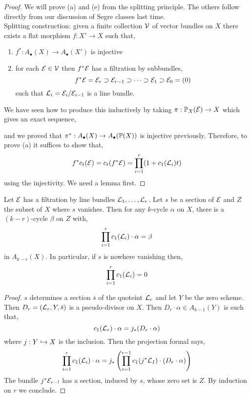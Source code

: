 \documentclass[12pt]{article}
\begin{document}
\begin{proof}
We will prove (a) and (e) from the splitting principle. The others follow directly from our discussion of Segre classes last time. 
\bigskip\\
Splitting construction: given a finite collection $\cV$ of vector bundles on $X$ there exists a flat morphism $f : X' \to X$ such that,
\begin{enumerate}
\item $f^* : A_\bullet(X) \to A_\bullet(X')$ is injective
\item for each $\E \in \cV$ then $f^* \E$ has a filtration by subbundles,
\[ f^* \E = \E_r \supset \E_{r-1} \supset \cdots \supset \E_1 \supset \E_0 = (0) \]
such that $\L_i = \E_i / \E_{i-1}$ is a line bundle. 
\end{enumerate}
We have seen how to produce this inductively by taking $\pi : \P_X(\E) \to X$ which gives an exact sequence,
and we proved that $\pi^* : A_\bullet(X) \to A_\bullet(\P(X))$ is injective previously. Therefore, to prove (a) it suffices to show that,
\[ f^* c_t(\E) = c_t(f^* \E) = \prod_{i = 1}^r (1 + c_1(\L_i) t) \]
using the injectivity. We need a lemma first.
\end{proof}

\begin{prop}
Let $\E$ has a filtration by line bundles $\L_1, \dots , \L_r$. Let $s$ be a section of $\E$ and $Z$ the subset of $X$ where $s$ vanishes. Then for any $k$-cycle $\alpha$ on $X$, there is a $(k-r)$-cycle $\beta$ on $Z$ with,
\[ \prod_{i = 1}^r c_1(\L_i) \cdot \alpha = \beta \]
in $A_{k-r}(X)$. In particular, if $s$ is nowhere vanishing then,
\[ \prod_{i = 1}^r c_1(\L_i) = 0 \]
\end{prop}

\begin{proof}
$s$ determines a section $\bar{s}$ of the quoteint $\L_r$ and let $Y$ be the zero scheme. Then $D_r = (\L_r, Y, \bar{s})$ is a pseudo-divisor on $X$. Then $D_r \cdot \alpha \in A_{k-1}(Y)$ is such that,
\[ c_1(\L_r) \cdot \alpha = j_*(D_r \cdot \alpha) \]
where $j : Y \embed X$ is the inclusion. Then the projection formal says,
\[ \prod_{i = 1}^r c_1(\L_i) \cdot \alpha = j_* \left( \prod_{i = 1}^{r-1} c_1(j^* \L_I) \cdot (D_r \cdot \alpha) \right) \]
The bundle $j^* \E_{r-!}$ has a section, induced by $s$, whose zero set is $Z$. By induction on $r$ we conclude. 
\end{proof}
\end{document}
